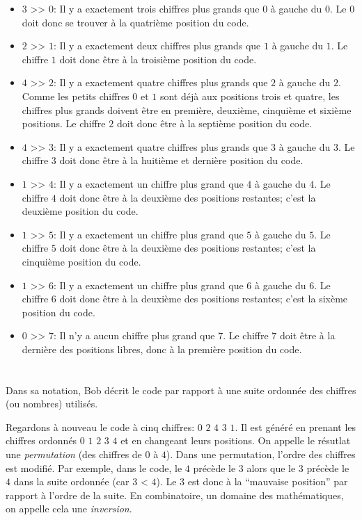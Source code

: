 {{\begin{itemize}
  \item $3$ >\textcompwordmark{}> $0$:  Il y a exactement trois chiffres plus grands que $0$ à gauche du $0$. Le $0$ doit donc se trouver à la quatrième position du code.
  \item $2$ >\textcompwordmark{}> $1$:  Il y a exactement deux chiffres plus grands que $1$ à gauche du $1$. Le chiffre $1$ doit donc être à la troisième position du code.
  \item $4$ >\textcompwordmark{}> $2$:  Il y a exactement quatre chiffres plus grands que $2$ à gauche du $2$. Comme les petits chiffres $0$ et $1$ sont déjà aux positions trois et quatre, les chiffres plus grands doivent être en première, deuxième, cinquième et sixième positions. Le chiffre $2$ doit donc être à la septième position du code.
  \item $4$ >\textcompwordmark{}> $3$:  Il y a exactement quatre chiffres plus grands que $3$ à gauche du $3$. Le chiffre $3$ doit donc être à la huitième et dernière position du code.
  \item $1$ >\textcompwordmark{}> $4$:  Il y a exactement un chiffre plus grand que $4$ à gauche du $4$. Le chiffre $4$ doit donc être à la deuxième des positions restantes; c’est la deuxième position du code.
  \item $1$ >\textcompwordmark{}> $5$:  Il y a exactement un chiffre plus grand que $5$ à gauche du $5$. Le chiffre $5$ doit donc être à la deuxième des positions restantes; c’est la cinquième position du code.
  \item $1$ >\textcompwordmark{}> $6$:  Il y a exactement un chiffre plus grand que $6$ à gauche du $6$. Le chiffre $6$ doit donc être à la deuxième des positions restantes; c’est la sixème position du code.
  \item $0$ >\textcompwordmark{}> $7$:  Il n’y a aucun chiffre plus grand que $7$. Le chiffre $7$ doit être à la dernière des positions libres, donc à la première position du code.
\end{itemize}



\section*{\BrochureItsInformatics}
Dans sa notation, Bob décrit le code par rapport à une suite ordonnée des chiffres (ou nombres) utilisés.

Regardons à nouveau le code à cinq chiffres: $0$ $2$ $4$ $3$ $1$. Il est généré en prenant les chiffres ordonnés $0$ $1$ $2$ $3$ $4$ et en changeant leurs positions. On appelle le résutlat une \emph{permutation} (des chiffres de $0$ à $4$). Dans une permutation, l’ordre des chiffres est modifié. Par exemple, dans le code, le $4$ précède le $3$ alors que le $3$ précède le $4$ dans la suite ordonnée (car $3$ < $4$). Le $3$ est donc à la “mauvaise position” par rapport à l’ordre de la suite. En combinatoire, un domaine des mathématiques, on appelle cela une \emph{inversion}.

}}

